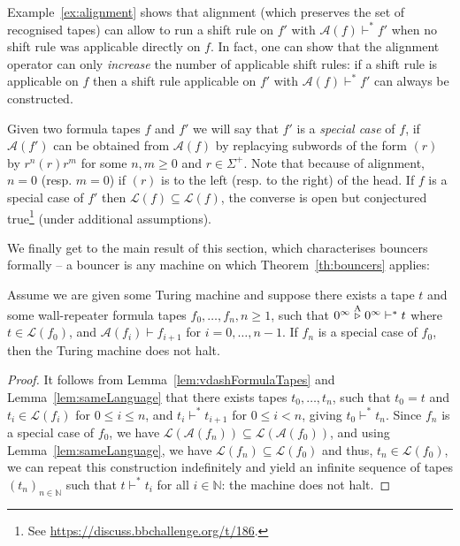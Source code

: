 \begin{remark}
    Example~\ref{ex:alignment} shows that alignment (which preserves the set of recognised tapes) can allow to run a shift rule on $f'$ with $\mathcal{A}(f) \vdash^* f'$ when no shift rule was applicable directly on $f$. In fact, one can show that the alignment operator can only \textit{increase} the number of applicable shift rules: if a shift rule is applicable on $f$ then a shift rule applicable on $f'$ with $\mathcal{A}(f) \vdash^* f'$ can always be constructed.
\end{remark}

Given two formula tapes $f$ and $f'$ we will say that $f'$ is a \textit{special case} of $f$, if $\mathcal{A}(f')$ can be obtained from $\mathcal{A}(f)$ by replacying subwords of the form $(r)$ by $r^n(r)r^m$ for some $n,m\geq 0$ and $r\in\Sigma^+$. Note that because of alignment, $n=0$ (resp. $m=0$) if $(r)$ is to the left (resp. to the right) of the head. If $f$ is a special case of $f'$ then $\mathcal{L}(f) \subseteq \mathcal{L}(f)$, the converse is open but conjectured true\footnote{See \url{https://discuss.bbchallenge.org/t/186}.} (under additional assumptions).

We finally get to the main result of this section, which characterises bouncers formally -- a bouncer is any machine on which Theorem~\ref{th:bouncers} applies:

\begin{theorem}[Bouncers]\label{th:bouncers}
    Assume we are given some Turing machine and suppose there exists a tape $t$ and some wall-repeater formula tapes $f_0,\dots,f_n, n\geq 1$, such that $0^\infty \stackrel{\text{A}}\triangleright 0^\infty \vdash^* t$ where $t \in \mathcal{L}(f_0)$, and $\mathcal{A}(f_i) \vdash f_{i+1}$ for $i=0,\dots,n-1$. If $f_n$ is a special case of $f_0$, then the Turing machine does not halt.
\end{theorem}

\begin{proof}
    It follows from Lemma~\ref{lem:vdashFormulaTapes} and Lemma~\ref{lem:sameLanguage} that there exists tapes $t_0, \dots, t_n$, such that $t_0 = t$ and $t_i\in \mathcal{L}(f_i)$ for $0 \leq i \leq n$, and $t_i \vdash^* t_{i+1}$ for $0 \leq i < n$, giving $t_0 \vdash^* t_n$. Since $f_n$ is a special case of $f_0$, we have $\mathcal{L}(\mathcal{A}(f_n)) \subseteq \mathcal{L}(\mathcal{A}(f_0))$, and using Lemma~\ref{lem:sameLanguage}, we have $\mathcal{L}(f_n) \subseteq \mathcal{L}(f_0)$ and thus, $t_n \in \mathcal{L}(f_0)$, we can repeat this construction indefinitely and yield an infinite sequence of tapes $(t_n)_{n\in\mathbb{N}}$ such that $t \vdash^* t_i$ for all $i\in\mathbb{N}$: the machine does not halt.
\end{proof}


